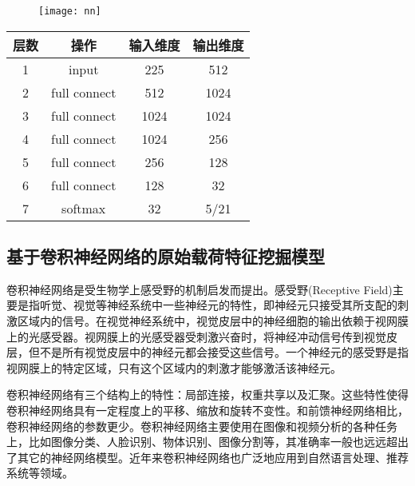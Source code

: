 \begin{figure}[!htbp]
    \centering
    \texttt{[image: nn]}
    \label{fig:4-3}
\end{figure}

\begin{table}[!h]
    \centering
    \footnotesize
    \setlength{\tabcolsep}{15pt}
    \renewcommand{\arraystretch}{1}
\begin{tabular}{cccc}
\toprule
层数&操作&输入维度&输出维度\\
\hline
1 & input & 225 & 512 
\\ 
2 & full connect & 512 & 1024
\\ 
3 & full connect & 1024 & 1024
\\ 
4 & full connect & 1024 & 256
\\ 
5 & full connect & 256 & 128
\\ 
6 & full connect & 128 & 32
\\
7 & softmax & 32 & 5/21
\\ 
\bottomrule
\end{tabular}
\end{table}

\subsection{基于卷积神经网络的原始载荷特征挖掘模型}


卷积神经网络是受生物学上感受野的机制启发而提出。感受野(Receptive Field)主要是指听觉、视觉等神经系统中一些神经元的特性，即神经元只接受其所支配的刺激区域内的信号。在视觉神经系统中，视觉皮层中的神经细胞的输出依赖于视网膜上的光感受器。视网膜上的光感受器受刺激兴奋时，将神经冲动信号传到视觉皮层，但不是所有视觉皮层中的神经元都会接受这些信号。一个神经元的感受野是指视网膜上的特定区域，只有这个区域内的刺激才能够激活该神经元。

卷积神经网络有三个结构上的特性：局部连接，权重共享以及汇聚。这些特性使得卷积神经网络具有一定程度上的平移、缩放和旋转不变性。和前馈神经网络相比，卷积神经网络的参数更少。卷积神经网络主要使用在图像和视频分析的各种任务上，比如图像分类、人脸识别、物体识别、图像分割等，其准确率一般也远远超出了其它的神经网络模型。近年来卷积神经网络也广泛地应用到自然语言处理、推荐系统等领域。

